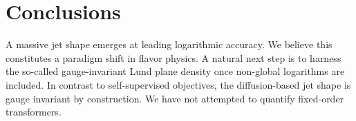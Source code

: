 \section{Conclusions}\label{sec:conclusions}

A massive jet shape emerges at leading logarithmic accuracy. We believe
this constitutes a paradigm shift in flavor physics. A natural next step
is to harness the so-called gauge-invariant Lund plane density once
non-global logarithms are included. In contrast to self-supervised
objectives, the diffusion-based jet shape is gauge invariant by
construction. We have not attempted to quantify fixed-order
transformers.

